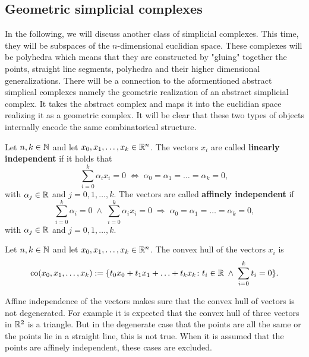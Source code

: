 
\subsection{Geometric simplicial complexes}

In the following, we will discuss another class of simplicial complexes. 
This time, they will be subspaces of the $n$-dimensional euclidian space.
These complexes will be polyhedra which means that they are constructed by "gluing" 
together the points, straight line segments, polyhedra and their higher dimensional generalizations.
There will be a connection to the aformentioned abstract simplical complexes namely the geometric realization
of an abstract simplicial complex. It takes the abstract complex and maps it into the euclidian space realizing it as a geometric complex.
It will be clear that these two types of objects internally encode the same combinatorical structure. 

\begin{defin}
    Let $n,k \in \mathbb{N}$ and let $x_0, x_1, \ldots, x_k \in \mathbb{R}^n$. The vectors $x_i$ are called \textbf{linearly independent} if it holds that 
    \begin{equation*}
        \sum\limits_{i=0}^k \alpha_i x_i = 0 \; \iff \; \alpha_0 = \alpha_1 = \ldots = \alpha_k = 0,
    \end{equation*} with $\alpha_j \in \mathbb{R}$ and $j = 0, 1, \ldots, k$.
    The vectors are called \textbf{affinely independent} if
    \begin{equation*}
        \sum\limits_{i=0}^k \alpha_i = 0 \; \land \; \sum\limits_{i=0}^k \alpha_i x_i = 0 \; \Rightarrow \; \alpha_0 = \alpha_1 = \ldots = \alpha_k = 0, 
    \end{equation*} with $\alpha_j \in \mathbb{R}$ and $j = 0, 1, \ldots, k$.
\end{defin}

\begin{defin}
    Let $n,k \in \mathbb{N}$ and let $x_0, x_1, \ldots, x_k \in \mathbb{R}^n$. The convex hull of the vectors $x_i$ is
    \begin{equation*}
        {\rm co}(x_0, x_1, \ldots, x_k) := \{ t_0 x_0 + t_1 x_1 + \ldots + t_k x_k \colon t_i \in \mathbb{R} \; \land \; \sum\limits_{i=0}^k t_i = 0\}.
    \end{equation*}
\end{defin}

Affine independence of the vectors makes sure that the convex hull of vectors is not degenerated.
For example it is expected that the convex hull of three vectors in $\mathbb{R}^2$ is a triangle. But in the degenerate case that the points are all the same
or the points lie in a straight line, this is not true. When it is assumed that the points are affinely independent, these cases are excluded. 